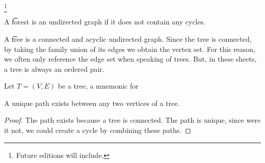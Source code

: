 
\footnote{Future editions will include.}


A \t{forest} is an undirected graph if it does not contain any cycles.

A \t{tree} is a connected and acyclic undirected graph.
Since the tree is connected, by taking the family union of its edges we obtain the vertex set.
For this reason, we often only reference the edge set when speaking of trees.
But, in these sheets, a tree is always an ordered pair.




Let $T = (V, E)$ be a tree, a mnemonic for 
%

%
%

\begin{proposition}

A unique path exists between any two vertices of a tree.

\begin{proof}
  The path exists because a tree is connected.
  The path is unique, since were it not, we could create a cycle by combining these paths.
\end{proof}

\end{proposition}

\blankpage
